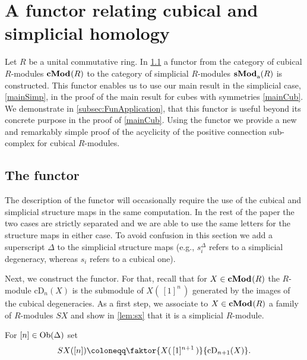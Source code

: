 \documentclass[12pt]{amsart}
\theoremstyle{plain}
\numberwithin{lemma}{\DefaultNumberTheoremWithin}
\numberwithin{claim}{\DefaultNumberTheoremWithin}
\numberwithin{theorem}{\DefaultNumberTheoremWithin}
\numberwithin{corollary}{\DefaultNumberTheoremWithin}
\numberwithin{proposition}{\DefaultNumberTheoremWithin}
\numberwithin{conjecture}{\DefaultNumberTheoremWithin}
\theoremstyle{definition}
\theoremstyle{definition}
\numberwithin{question}{\DefaultNumberTheoremWithin}
\theoremstyle{definition}
\numberwithin{problem}{\DefaultNumberTheoremWithin}
\theoremstyle{remark}
\numberwithin{remark}{\DefaultNumberTheoremWithin}
\theoremstyle{remark}
\numberwithin{example}{\DefaultNumberTheoremWithin}
\def\one{[1]}
\def\letbe{\coloneqq}
\def\cDeg{\mathrm{cD}}     %
\newcommand{\sMod}[2]{\mathbf{sMod}_\textnormal{a}^{\textnormal{#1}}(#2)}  %
\newcommand{\cMod}[2]{\mathbf{cMod}^{\textnormal{#1}}(#2)}  %
\begin{document}
\section{A functor relating cubical and simplicial homology} \label{sec:simcub}
Let $R$ be a unital commutative ring.
In \ref{subsec:FunConstruction} a functor from the category of cubical $R$-modules $\cMod{}{R}$ to the category of simplicial $R$-modules $\sMod{}{R}$ is constructed. This functor enables us to use our main result in the simplicial case, \ref{mainSimp}, in the proof of the main result for cubes with symmetries \ref{mainCub}. 
We demonstrate in \ref{subsec:FunApplication}, that this functor is useful beyond its concrete purpose in the proof of \ref{mainCub}. 
Using the functor we provide a new and remarkably simple proof of the acyclicity of the positive connection sub-complex for cubical $R$-modules.


\subsection{The functor}\label{subsec:FunConstruction} 

The description of the functor will occasionally require the use of the cubical and simplicial structure maps in the same computation. In the rest of the paper the two cases are strictly separated and
we are able to use the same letters for the structure maps in either case. To avoid confusion in this section we add a superscript $\Delta$ to the simplicial structure maps (e.g., $s_i^\Delta$ refers to a simplicial degeneracy, whereas $s_i$ refers to a cubical one).

Next, we construct the functor. For that,
recall that for $X \in \cMod{}{R}$ the $R$-module $\cDeg_n(X)$ is the submodule of $X(\,\one^{n}\,)$ generated by the images of the cubical degeneracies. 
As a first step, we associate to $X \in \cMod{}{R}$ a family of $R$-modules $SX$ and show in \ref{lem:sx} that it is a simplicial $R$-module.

For $[n]\in \textnormal{Ob}(\Delta)$ set \[
    SX([n])\letbe \faktor{X(\,\one^{n+1}\,)}{\cDeg_{n+1}(X)}.
    \]
    
\end{document}

